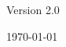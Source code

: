 
\begin{center}
\begin{bfseries}
\bigskip
\bigskip

Version 2.0

\bigskip

\today

\end{bfseries}
\end{center}
